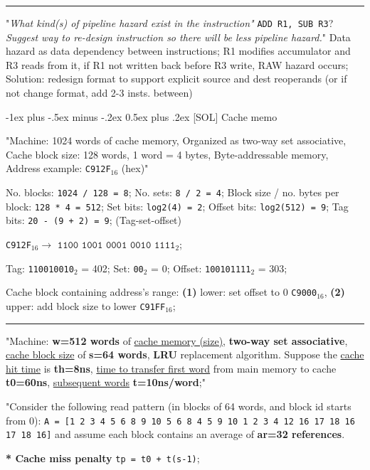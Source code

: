 \documentclass[a4paper]{article}
\makeatletter
\renewcommand{\section}{\@startsection{section}{1}{0mm}%
                                {-1ex plus -.5ex minus -.2ex}%
                                {0.5ex plus .2ex}%
                                {\normalfont\normalsize\bfseries}}
\makeatother
\begin{document}
\begin{multicols*}{2}
  \rule{1\linewidth}{0.4pt}

  "\textit{What kind(s) of pipeline hazard exist in the instruction"} \texttt{ADD R1, SUB R3}? \textit{Suggest way to re-design instruction so there will be less pipeline hazard.}"
  Data hazard as data dependency between instructions; R1 modifies accumulator and R3 reads from it, if R1 not written back before R3 write, RAW hazard occurs; Solution: redesign format to support explicit source and dest reoperands (or if not change format, add 2-3 insts. between)


  \section{[SOL] Cache memo}

  "Machine: 1024 words of cache memory, Organized as two-way set associative, Cache block size: 128 words, 1 word = 4 bytes, Byte-addressable memory, Address example: \texttt{C912F}$_{16}$ (hex)"

  No. blocks: \texttt{1024 / 128 = 8}; No. sets: \texttt{8 / 2 = 4}; Block size / no. bytes per block: \texttt{128 * 4 = 512};  Set bits: \texttt{log2(4) = 2}; Offset bits: \texttt{log2(512) = 9}; Tag bits: \texttt{20 - (9 + 2) = 9}; (Tag-set-offset)

  \texttt{C912F}$_{16} \to$ $\texttt{1100 1001 0001 0010 1111}_2$;

  Tag: \texttt{110010010}$_2$ = 402; Set: \texttt{00}$_2$ = 0; Offset: \texttt{100101111}$_2$ = 303;

  Cache block containing address's range: \textbf{(1)} lower: set offset to 0 \texttt{C9000}$_{16}$, \textbf{(2)} upper: add block size to lower \texttt{C91FF}$_{16}$;

  \rule{1\linewidth}{0.4pt}

  "Machine: \textbf{w=512 words} of \ul{cache memory (size)}, \textbf{two-way set associative}, \ul{cache block size} of \textbf{s=64 words}, \textbf{LRU} replacement algorithm. Suppose the \ul{cache hit time} is \textbf{th=8ns}, \ul{time to transfer first word} from main memory to cache \textbf{t0=60ns}, \ul{subsequent words} \textbf{t=10ns/word};"

  "Consider the following read pattern (in blocks of 64 words, and block id starts from 0):
  \texttt{A = [1 2 3 4 5 6 8 9 10 5 6 8 4 5 9 10 1 2 3 4 12 16 17 18 16 17 18 16]}
  and assume each block contains an average of \textbf{ar=32 references}.

  \textbf{* Cache miss penalty} \texttt{tp = t0 + t(s-1)};


\end{multicols*}
\end{document}
